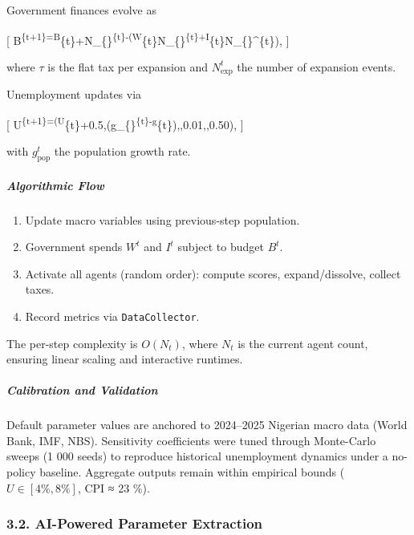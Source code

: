 \documentclass[
]{article}
\providecommand{\tightlist}{%
  \setlength{\itemsep}{0pt}\setlength{\parskip}{0pt}}
\begin{document}
Government finances evolve as

{[}
B\textsuperscript{\{t+1\}=B}\{t\}+\tau N\_\{\}\textsuperscript{\{t\}-\bigl(W}\{t\}N\_\{\}\textsuperscript{\{t\}+I}\{t\}N\_\{\}\^{}\{t\}\bigr),
{]}

where \(\tau\) is the flat tax per expansion and
\(N_{\mathrm{exp}}^{t}\) the number of expansion events.

Unemployment updates via

{[}
U\textsuperscript{\{t+1\}=\bigl(U}\{t\}+0.5,(g\_\{\}\textsuperscript{\{t\}-g}\{t\}),,0.01,,0.50\bigr),
{]}

with \(g_{\mathrm{pop}}^{t}\) the population growth rate.

\subparagraph{Algorithmic Flow}\label{algorithmic-flow}

\begin{enumerate}
\def\labelenumi{\arabic{enumi}.}
\tightlist
\item
  Update macro variables using previous-step population.\\
\item
  Government spends \(W^{t}\) and \(I^{t}\) subject to budget
  \(B^{t}\).\\
\item
  Activate all agents (random order): compute scores, expand/dissolve,
  collect taxes.\\
\item
  Record metrics via \texttt{DataCollector}.
\end{enumerate}

The per-step complexity is \(O(N_t)\), where \(N_t\) is the current
agent count, ensuring linear scaling and interactive runtimes.

\subparagraph{Calibration and
Validation}\label{calibration-and-validation}

Default parameter values are anchored to 2024--2025 Nigerian macro data
(World Bank, IMF, NBS). Sensitivity coefficients were tuned through
Monte-Carlo sweeps (1 000 seeds) to reproduce historical unemployment
dynamics under a no-policy baseline. Aggregate outputs remain within
empirical bounds (\(U\in[4\%,8\%]\), CPI ≈ 23 \%).

\subsubsection{3.2. AI-Powered Parameter
Extraction}\label{ai-powered-parameter-extraction}
\end{document}

